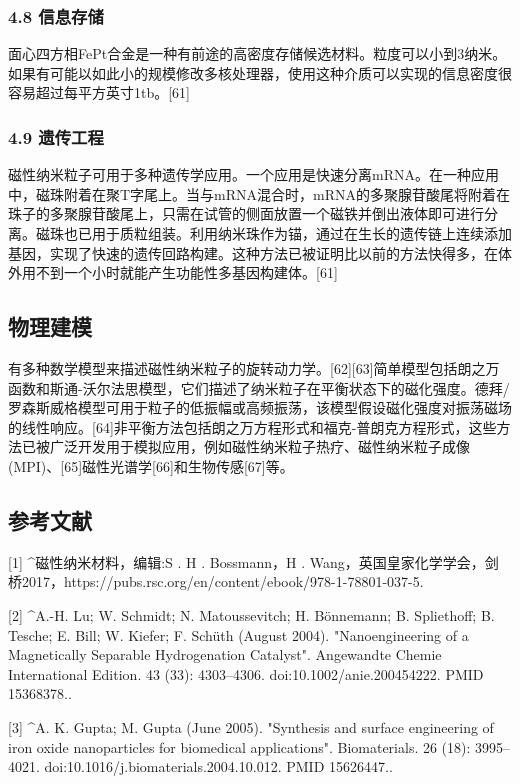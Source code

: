 \subsubsection{4.8 信息存储}
面心四方相FePt合金是一种有前途的高密度存储候选材料。粒度可以小到3纳米。如果有可能以如此小的规模修改多核处理器，使用这种介质可以实现的信息密度很容易超过每平方英寸1tb。[61]

\subsubsection{4.9 遗传工程}
磁性纳米粒子可用于多种遗传学应用。一个应用是快速分离mRNA。在一种应用中，磁珠附着在聚T字尾上。当与mRNA混合时，mRNA的多聚腺苷酸尾将附着在珠子的多聚腺苷酸尾上，只需在试管的侧面放置一个磁铁并倒出液体即可进行分离。磁珠也已用于质粒组装。利用纳米珠作为锚，通过在生长的遗传链上连续添加基因，实现了快速的遗传回路构建。这种方法已被证明比以前的方法快得多，在体外用不到一个小时就能产生功能性多基因构建体。[61]

\subsection{物理建模}
有多种数学模型来描述磁性纳米粒子的旋转动力学。[62][63]简单模型包括朗之万函数和斯通-沃尔法思模型，它们描述了纳米粒子在平衡状态下的磁化强度。德拜/罗森斯威格模型可用于粒子的低振幅或高频振荡，该模型假设磁化强度对振荡磁场的线性响应。[64]非平衡方法包括朗之万方程形式和福克-普朗克方程形式，这些方法已被广泛开发用于模拟应用，例如磁性纳米粒子热疗、磁性纳米粒子成像(MPI)、[65]磁性光谱学[66]和生物传感[67]等。

\subsection{参考文献}
[1]
^磁性纳米材料，编辑:S . H . Bossmann，H . Wang，英国皇家化学学会，剑桥2017，https://pubs.rsc.org/en/content/ebook/978-1-78801-037-5.

[2]
^A.-H. Lu; W. Schmidt; N. Matoussevitch; H. Bönnemann; B. Spliethoff; B. Tesche; E. Bill; W. Kiefer; F. Schüth (August 2004). "Nanoengineering of a Magnetically Separable Hydrogenation Catalyst". Angewandte Chemie International Edition. 43 (33): 4303–4306. doi:10.1002/anie.200454222. PMID 15368378..

[3]
^A. K. Gupta; M. Gupta (June 2005). "Synthesis and surface engineering of iron oxide nanoparticles for biomedical applications". Biomaterials. 26 (18): 3995–4021. doi:10.1016/j.biomaterials.2004.10.012. PMID 15626447..

